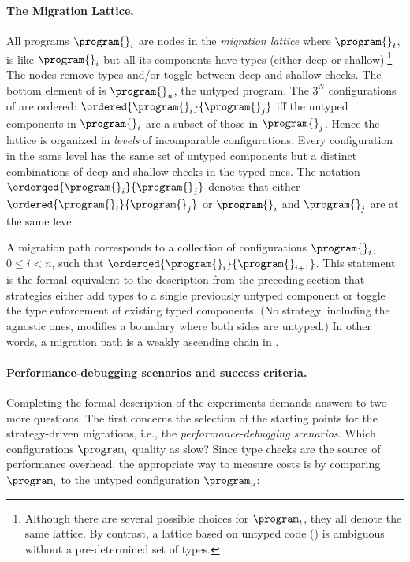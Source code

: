 \paragraph{The Migration Lattice.}  All programs $\program{}_i$ are nodes in the
\emph{migration lattice}  where ${\program{}_t}$, is like
${\program{}_i}$ but all its components have types (either deep or
shallow).\footnote{Although there are several possible choices for
$\program_t$, they all denote the same lattice. By contrast, a lattice
based on untyped code () is ambiguous without a
pre-determined set of types.}
The nodes remove types and/or toggle between deep and shallow checks.
The bottom element of  is ${\program{}_u}$, the untyped
program.
The $3^N$ configurations of  are ordered:
$\ordered{\program{}_i}{\program{}_j}$ iff
the untyped components in ${\program{}_i}$ are a subset
of those in ${\program{}_j}$.
Hence the lattice is organized in \emph{levels} of incomparable
configurations.
Every configuration in the same level has the same set of untyped components
but a distinct combinations of deep and shallow checks in the typed ones.
The notation $\orderqed{\program{}_i}{\program{}_j}$ denotes that either
$\ordered{\program{}_i}{\program{}_j}$ or $\program{}_i$ and $\program{}_j$
are at the same level.

A migration path corresponds to a collection of configurations $\program{}_i$,
$0 \leq i < n$, such that $\orderqed{\program{}_i}{\program{}_{i+1}}$.
This statement is the formal equivalent to the
description from the preceding section that strategies either add types to a
single previously untyped component or toggle the type enforcement of existing
typed components.
(No strategy, including the agnostic ones, modifies a boundary where both sides
are untyped.)
In other words, a migration path is a weakly ascending chain in
.


\paragraph{Performance-debugging scenarios and success criteria.} Completing the
formal description of the experiments demands answers to two more questions.
The first concerns the selection of the starting points for the strategy-driven
migrations, i.e., the \emph{performance-debugging scenarios}.
Which configurations $\program_i$ quality as slow?
Since type checks are the source of performance overhead, the appropriate
way to measure costs is by comparing $\program_i$ to the untyped configuration
$\program_u$:

